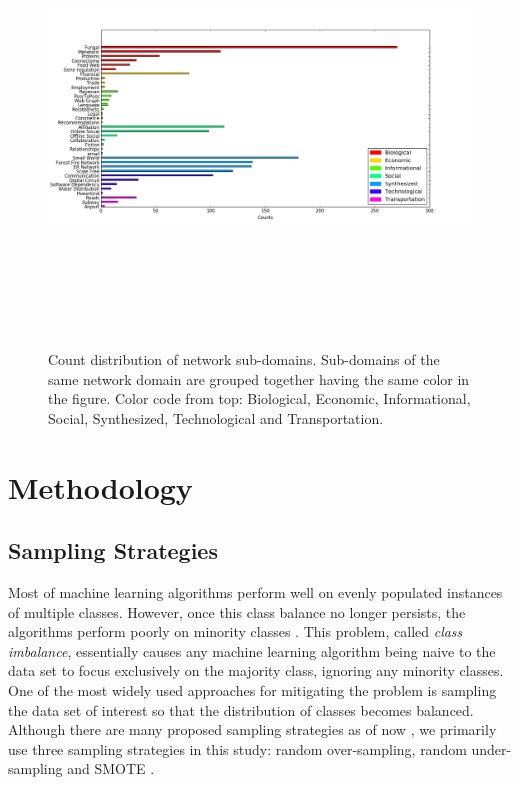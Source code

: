 \documentclass{article}
\begin{document}
	\begin{figure}[ht]
	\begin{center}
		\vspace{0.5cm}
		\includegraphics[clip,width=19cm,height = 12cm]{figs/subdomain_dist.png}
		\vspace{0.5cm}
		\caption{Count distribution of network sub-domains. Sub-domains of the same network domain are grouped together having the same color in the figure. Color code from top: Biological, Economic, Informational, Social, Synthesized, Technological and Transportation.}
		\label{sub_dist}
	\end{center}
	\end{figure}

	

\section{Methodology}

	\subsection{Sampling Strategies}
Most of machine learning algorithms perform well on evenly populated instances of multiple classes. However, once this class balance no longer persists, the algorithms perform poorly on minority classes . This problem, called \textit{class imbalance}, essentially causes any machine learning algorithm being naive to the data set to focus exclusively on the majority class, ignoring any minority classes. One of the most widely used approaches for mitigating the problem is sampling the data set of interest so that the distribution of classes becomes balanced. Although there are many proposed sampling strategies as of now \cite{SurveySampling}, we primarily use three sampling strategies in this study: random over-sampling, random under-sampling and SMOTE \cite{SMOTE}.
\end{document}
